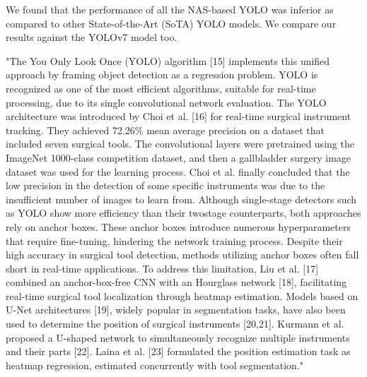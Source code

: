 We found that the performance of all the NAS-based YOLO was inferior as compared to other State-of-the-Art (SoTA) YOLO models. We compare our results against the YOLOv7 model too.

"The You Only Look Once (YOLO) algorithm [15] implements this unified approach by framing object detection as a regression problem. YOLO is recognized as one of the most efficient algorithms, suitable for real-time processing, due to its single convolutional network evaluation. The YOLO architecture was introduced by Choi et al. [16] for real-time surgical instrument tracking. They achieved 72.26\% mean average precision on a dataset that included seven surgical tools. The convolutional layers were pretrained using the ImageNet 1000-class competition dataset, and then a gallbladder surgery image dataset was used for the learning process. Choi et al. finally concluded that the low precision in the detection of some specific instruments was due to the insufficient number of images to learn from. Although single-stage detectors such as YOLO show more efficiency than their twostage counterparts, both approaches rely on anchor boxes. These anchor boxes introduce numerous hyperparameters that require fine-tuning, hindering the network training process. Despite their high accuracy in surgical tool detection, methods utilizing anchor boxes often fall short in real-time applications. To address this limitation, Liu et al. [17] combined an anchor-box-free CNN with an Hourglass network [18], facilitating real-time surgical tool localization through heatmap estimation. Models based on U-Net architectures [19], widely popular in segmentation tasks, have also been used to determine the position of surgical instruments [20,21]. Kurmann et al. proposed a U-shaped network to simultaneously recognize multiple instruments and their parts [22]. Laina et al. [23] formulated the position estimation task as heatmap regression, estimated concurrently with tool segmentation."

